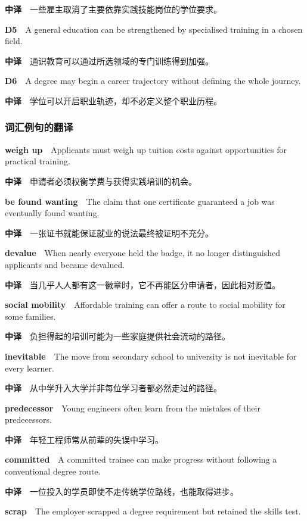 \documentclass[
  11pt,
]{ctexart}
\begin{document}
\textbf{中译}　一些雇主取消了主要依靠实践技能岗位的学位要求。

\textbf{D5}　A general education can be strengthened by specialised
training in a chosen field.

\textbf{中译}　通识教育可以通过所选领域的专门训练得到加强。

\textbf{D6}　A degree may begin a career trajectory without defining the
whole journey.

\textbf{中译}　学位可以开启职业轨迹，却不必定义整个职业历程。

\subsubsection{词汇例句的翻译}\label{ux8bcdux6c47ux4f8bux53e5ux7684ux7ffbux8bd1}

\textbf{weigh up}　Applicants must weigh up tuition costs against
opportunities for practical training.

\textbf{中译}　申请者必须权衡学费与获得实践培训的机会。

\textbf{be found wanting}　The claim that one certificate guaranteed a
job was eventually found wanting.

\textbf{中译}　一张证书就能保证就业的说法最终被证明不充分。

\textbf{devalue}　When nearly everyone held the badge, it no longer
distinguished applicants and became devalued.

\textbf{中译}　当几乎人人都有这一徽章时，它不再能区分申请者，因此相对贬值。

\textbf{social mobility}　Affordable training can offer a route to
social mobility for some families.

\textbf{中译}　负担得起的培训可能为一些家庭提供社会流动的路径。

\textbf{inevitable}　The move from secondary school to university is not
inevitable for every learner.

\textbf{中译}　从中学升入大学并非每位学习者都必然走过的路径。

\textbf{predecessor}　Young engineers often learn from the mistakes of
their predecessors.

\textbf{中译}　年轻工程师常从前辈的失误中学习。

\textbf{committed}　A committed trainee can make progress without
following a conventional degree route.

\textbf{中译}　一位投入的学员即使不走传统学位路线，也能取得进步。

\textbf{scrap}　The employer scrapped a degree requirement but retained
the skills test.
\end{document}
